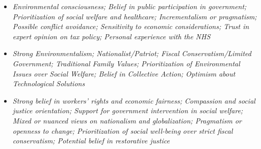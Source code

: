 \documentclass[11pt]{article}
\newcommand{\profiletext}[1]{\textit{#1}}
\begin{document}
\begin{itemize}
\item \profiletext{Environmental consciousness; Belief in public participation in government; Prioritization of social welfare and healthcare; Incrementalism or pragmatism; Possible conflict avoidance; Sensitivity to economic considerations; Trust in expert opinion on tax policy; Personal experience with the NHS}
\item \profiletext{Strong Environmentalism; Nationalist/Patriot; Fiscal Conservatism/Limited Government; Traditional Family Values; Prioritization of Environmental Issues over Social Welfare; Belief in Collective Action; Optimism about Technological Solutions}
\item \profiletext{Strong belief in workers' rights and economic fairness; Compassion and social justice orientation; Support for government intervention in social welfare; Mixed or nuanced views on nationalism and globalization; Pragmatism or openness to change; Prioritization of social well-being over strict fiscal conservatism; Potential belief in restorative justice}
\end{itemize}
\end{document}
